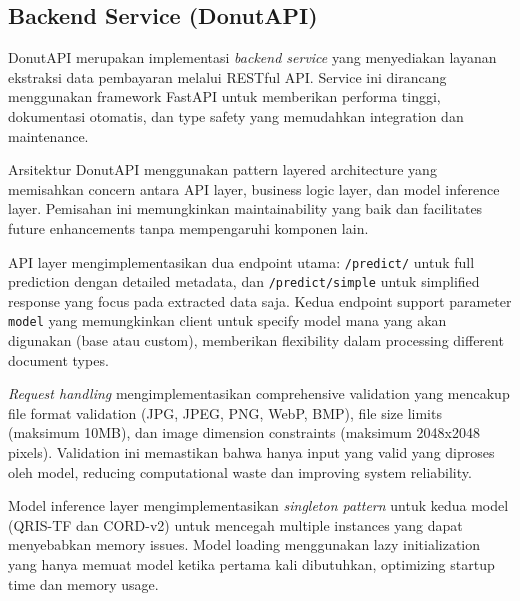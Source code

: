\subsection{Backend Service (DonutAPI)}
\label{subsec:backend-service-donutapi}

DonutAPI merupakan implementasi \emph{backend service} yang menyediakan layanan ekstraksi data pembayaran melalui RESTful API. Service ini dirancang menggunakan framework FastAPI untuk memberikan performa tinggi, dokumentasi otomatis, dan type safety yang memudahkan integration dan maintenance.


Arsitektur DonutAPI menggunakan pattern layered architecture yang memisahkan concern antara API layer, business logic layer, dan model inference layer. Pemisahan ini memungkinkan maintainability yang baik dan facilitates future enhancements tanpa mempengaruhi komponen lain.

API layer mengimplementasikan dua endpoint utama: \texttt{/predict/} untuk full prediction dengan detailed metadata, dan \texttt{/predict/simple} untuk simplified response yang focus pada extracted data saja. Kedua endpoint support parameter \texttt{model} yang memungkinkan client untuk specify model mana yang akan digunakan (base atau custom), memberikan flexibility dalam processing different document types.

\emph{Request handling} mengimplementasikan comprehensive validation yang mencakup file format validation (JPG, JPEG, PNG, WebP, BMP), file size limits (maksimum 10MB), dan image dimension constraints (maksimum 2048x2048 pixels). Validation ini memastikan bahwa hanya input yang valid yang diproses oleh model, reducing computational waste dan improving system reliability.


Model inference layer mengimplementasikan \emph{singleton pattern} untuk kedua model (QRIS-TF dan CORD-v2) untuk mencegah multiple instances yang dapat menyebabkan memory issues. Model loading menggunakan lazy initialization yang hanya memuat model ketika pertama kali dibutuhkan, optimizing startup time dan memory usage.

